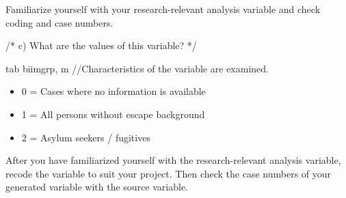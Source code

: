 \documentclass[letterpaper,10pt,openany,onesideH,english]{sphinxmanual}
\begin{document}
Familiarize yourself with your research-relevant analysis variable and check coding and case numbers.

%
\begin{sphinxVerbatim}[commandchars=\\\{\},numbers=left,firstnumber=1,stepnumber=1]
/*
c)	What are the values of this variable? 
*/

tab biimgrp, m //Characteristics of the variable are examined.
\end{sphinxVerbatim}

\begin{figure}[H]
\centering

\noindent{}
\end{figure}

\begin{itemize}
\item {} 
0 = Cases where no information is available

\item {} 
1 = All persons without escape background

\item {} 
2 = Asylum seekers / fugitives

\end{itemize}

After you have familiarized yourself with the research-relevant analysis variable, recode the variable to suit your project. Then check the case numbers of your generated variable with the source variable.
\end{document}
